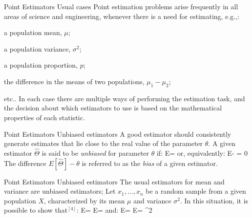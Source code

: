 \documentclass[t]{beamer}
\begin{document}

\begin{ftst}
{Point Estimators}
{Usual cases}
Point estimation problems arise frequently in all areas of science and engineering, whenever there is a need for estimating, e.g.,:

\bitems a population  mean, $\mu$;
	\item a population variance, $\sigma^2$;
	\item a population proportion, $p$;
	\item the difference in the means of two populations, $\mu_1-\mu_2$; 
	\item etc..
\eitem
\vhalf
In each case there are multiple ways of performing the estimation task, and the decision about which estimators to use is based on the mathematical properties of each statistic.
\end{ftst}


\begin{ftst}
{Point Estimators}
{Unbiased estimators}
A good estimator should consistently generate estimates that lie close to the real value of the parameter $\theta$.
\vone
A given estimator $\hat{\Theta}$ is said to be \textit{unbiased} for parameter $\theta$ if:
\beqs
E\left[\hat{\Theta}\right] = \theta
\eqs
\noindent or, equivalently:
\beqs
E\left[\hat{\Theta}\right] - \theta = 0
\eqs
\vone
The difference $E\left[\hat{\Theta}\right] - \theta$ is referred to as the \textit{bias} of a given estimator.
\end{ftst}


\begin{ftst}
{Point Estimators}
{Unbiased estimators}
The usual estimators for mean and variance are unbiased estimators;
\vone
Let $x_1,\ldots,x_n$ be a random sample from a given population $X$, characterized by its mean $\mu$ and variance $\sigma^2$. In this situation, it is possible to show that$^{[4]}$:
\beqs
E = E\left[\frac{1}{n}\sum\limits_{i=1}^{n}x_i\right] = \mu
\eqs
\noindent and:
\beqs
E\left[s^2\right] = E\left[\frac{1}{n-1}\sum\limits_{i=1}^{n}\left(x_i-\bar{x}\right)^2\right] = \sigma^2
\eqs
{}
\end{ftst}

\end{document}
